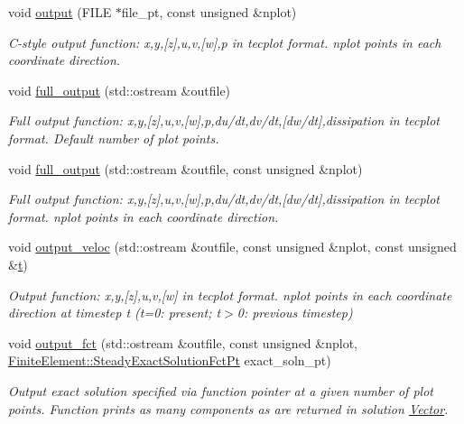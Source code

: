 \begin{DoxyCompactItemize}
void \hyperlink{classoomph_1_1PolarNavierStokesEquations_a1dd19ac88c126db21ad12bdb06a512f9}{output} (F\+I\+LE $\ast$file\+\_\+pt, const unsigned \&nplot)
\begin{DoxyCompactList}\small\item\em C-\/style output function\+: x,y,\mbox{[}z\mbox{]},u,v,\mbox{[}w\mbox{]},p in tecplot format. nplot points in each coordinate direction. \end{DoxyCompactList}\item 
void \hyperlink{classoomph_1_1PolarNavierStokesEquations_abe241e9deab5ea6f3b4059a63c19ec3d}{full\+\_\+output} (std\+::ostream \&outfile)
\begin{DoxyCompactList}\small\item\em Full output function\+: x,y,\mbox{[}z\mbox{]},u,v,\mbox{[}w\mbox{]},p,du/dt,dv/dt,\mbox{[}dw/dt\mbox{]},dissipation in tecplot format. Default number of plot points. \end{DoxyCompactList}\item 
void \hyperlink{classoomph_1_1PolarNavierStokesEquations_a51eb6471730901fdc5cccf2edbf2c870}{full\+\_\+output} (std\+::ostream \&outfile, const unsigned \&nplot)
\begin{DoxyCompactList}\small\item\em Full output function\+: x,y,\mbox{[}z\mbox{]},u,v,\mbox{[}w\mbox{]},p,du/dt,dv/dt,\mbox{[}dw/dt\mbox{]},dissipation in tecplot format. nplot points in each coordinate direction. \end{DoxyCompactList}\item 
void \hyperlink{classoomph_1_1PolarNavierStokesEquations_a960e2b96a00d4f29f91aeef9dafb1bdb}{output\+\_\+veloc} (std\+::ostream \&outfile, const unsigned \&nplot, const unsigned \&\hyperlink{cfortran_8h_af6f0bd3dc13317f895c91323c25c2b8f}{t})
\begin{DoxyCompactList}\small\item\em Output function\+: x,y,\mbox{[}z\mbox{]},u,v,\mbox{[}w\mbox{]} in tecplot format. nplot points in each coordinate direction at timestep t (t=0\+: present; t$>$0\+: previous timestep) \end{DoxyCompactList}\item 
void \hyperlink{classoomph_1_1PolarNavierStokesEquations_a72787983b9bcc07aafb46d5f7a2e592d}{output\+\_\+fct} (std\+::ostream \&outfile, const unsigned \&nplot, \hyperlink{classoomph_1_1FiniteElement_a690fd33af26cc3e84f39bba6d5a85202}{Finite\+Element\+::\+Steady\+Exact\+Solution\+Fct\+Pt} exact\+\_\+soln\+\_\+pt)
\begin{DoxyCompactList}\small\item\em Output exact solution specified via function pointer at a given number of plot points. Function prints as many components as are returned in solution \hyperlink{classoomph_1_1Vector}{Vector}. \end{DoxyCompactList}\item 

\end{DoxyCompactItemize}
